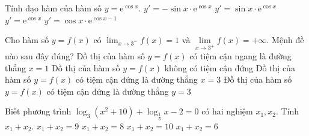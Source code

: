 \begin{ex}%
Tính đạo hàm của hàm số $y=\mathrm{e}^{\cos x}$.
\choice
{\True $y'=-\sin x\cdot \mathrm{e}^{\cos x}$}
{$y'=\sin x\cdot\mathrm{e}^{\cos x}$}
{$y'=\mathrm{e}^{\cos x}$}
{$y'=\cos x\cdot\mathrm{e}^{\cos x-1}$}
\end{ex}

\begin{ex}%
Cho hàm số $y=f(x)$ có $\displaystyle\lim_{x\rightarrow 3^{-}}f(x)=1$ và $\displaystyle\lim\limits_{x\rightarrow 3^{+}}f(x)=+\infty$. Mệnh đề nào sau đây đúng?
\choice
{Đồ thị của hàm số $y=f(x)$ có tiệm cận ngang là đường thẳng $x=1$}
{Đồ thị của hàm số $y=f(x)$ không có tiệm cận đứng}
{\True Đồ thị của hàm số $y=f(x)$ có tiệm cận đứng là đường thẳng $x=3$}
{Đồ thị của hàm số $y=f(x)$ có tiệm cận đứng là đường thẳng $y=3$}
\end{ex}

\begin{ex}%
Biết phương trình $\log_3(x^2+10)+\log_{\frac{1}{3}}x-2=0$ có hai nghiệm $x_1,x_2$. Tính $x_1+x_2$.
\choice
{\True $x_1+x_2=9$}
{$x_1+x_2=8$}
{$x_1+x_2=10$}
{$x_1+x_2=6$}
\end{ex}

